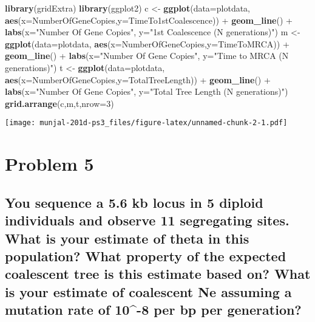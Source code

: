 \documentclass[]{article}
\newenvironment{Shaded}{\begin{snugshade}}{\end{snugshade}}
\newcommand{\KeywordTok}[1]{\textcolor[rgb]{0.13,0.29,0.53}{\textbf{{#1}}}}
\newcommand{\DataTypeTok}[1]{\textcolor[rgb]{0.13,0.29,0.53}{{#1}}}
\newcommand{\DecValTok}[1]{\textcolor[rgb]{0.00,0.00,0.81}{{#1}}}
\newcommand{\StringTok}[1]{\textcolor[rgb]{0.31,0.60,0.02}{{#1}}}
\newcommand{\NormalTok}[1]{{#1}}
\begin{document}
\begin{Shaded}
\begin{Highlighting}[]
\KeywordTok{library}\NormalTok{(gridExtra)}
\KeywordTok{library}\NormalTok{(ggplot2)}
\NormalTok{c <-}\StringTok{ }\KeywordTok{ggplot}\NormalTok{(}\DataTypeTok{data=}\NormalTok{plotdata, }\KeywordTok{aes}\NormalTok{(}\DataTypeTok{x=}\NormalTok{NumberOfGeneCopies,}\DataTypeTok{y=}\NormalTok{TimeTo1stCoalescence)) +}\StringTok{ }
\StringTok{      }\KeywordTok{geom_line}\NormalTok{() +}\StringTok{ }
\StringTok{      }\KeywordTok{labs}\NormalTok{(}\DataTypeTok{x=}\StringTok{"Number Of Gene Copies"}\NormalTok{, }\DataTypeTok{y=}\StringTok{"1st Coalescence (N generations)"}\NormalTok{)}
\NormalTok{m <-}\StringTok{ }\KeywordTok{ggplot}\NormalTok{(}\DataTypeTok{data=}\NormalTok{plotdata, }\KeywordTok{aes}\NormalTok{(}\DataTypeTok{x=}\NormalTok{NumberOfGeneCopies,}\DataTypeTok{y=}\NormalTok{TimeToMRCA)) +}\StringTok{ }\KeywordTok{geom_line}\NormalTok{() +}
\StringTok{      }\KeywordTok{labs}\NormalTok{(}\DataTypeTok{x=}\StringTok{"Number Of Gene Copies"}\NormalTok{, }\DataTypeTok{y=}\StringTok{"Time to MRCA (N generations)"}\NormalTok{)  }
\NormalTok{t <-}\StringTok{ }\KeywordTok{ggplot}\NormalTok{(}\DataTypeTok{data=}\NormalTok{plotdata, }\KeywordTok{aes}\NormalTok{(}\DataTypeTok{x=}\NormalTok{NumberOfGeneCopies,}\DataTypeTok{y=}\NormalTok{TotalTreeLength)) +}\StringTok{ }\KeywordTok{geom_line}\NormalTok{() +}
\StringTok{      }\KeywordTok{labs}\NormalTok{(}\DataTypeTok{x=}\StringTok{"Number Of Gene Copies"}\NormalTok{, }\DataTypeTok{y=}\StringTok{"Total Tree Length (N generations)"}\NormalTok{)}
\KeywordTok{grid.arrange}\NormalTok{(c,m,t,}\DataTypeTok{nrow=}\DecValTok{3}\NormalTok{)}
\end{Highlighting}
\end{Shaded}

\texttt{[image: munjal-201d-ps3\_files/figure-latex/unnamed-chunk-2-1.pdf]}

\section{Problem 5}\label{problem-5}

\subsection{You sequence a 5.6 kb locus in 5 diploid individuals and
observe 11 segregating sites. What is your estimate of theta in this
population? What property of the expected coalescent tree is this
estimate based on? What is your estimate of coalescent Ne assuming a
mutation rate of 10\^{}-8 per bp per
generation?}\label{you-sequence-a-5.6-kb-locus-in-5-diploid-individuals-and-observe-11-segregating-sites.-what-is-your-estimate-of-theta-in-this-population-what-property-of-the-expected-coalescent-tree-is-this-estimate-based-on-what-is-your-estimate-of-coalescent-ne-assuming-a-mutation-rate-of-10-8-per-bp-per-generation}
\end{document}
